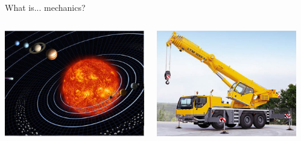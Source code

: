 \documentclass[handout,10pt]{beamer}
\begin{document}
\begin{frame}[t,fragile]{What is... mechanics?}
	\vfill
	\begin{columns}
    	\begin{column}{.33\textwidth}
	   		\includegraphics[width=\textwidth]{Pictures/solar} 	
		\end{column}
    	\begin{column}{.33\textwidth}
	   		\includegraphics[width=\textwidth]{Pictures/autogru-liebherr} 	
		\end{column}
    	\begin{column}{.33\textwidth}

\end{column}
\end{columns}
\end{frame}
\end{document}
